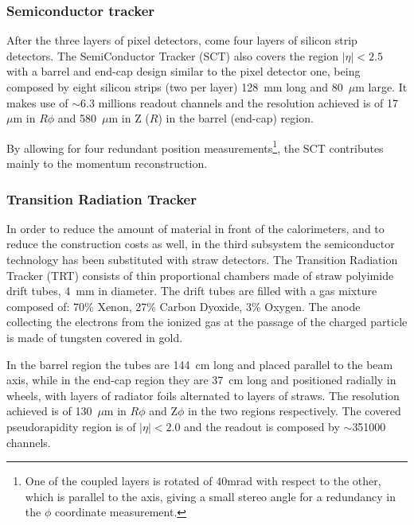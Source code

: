\subsubsection{Semiconductor tracker}

After the three layers of pixel detectors, come four layers of  silicon strip detectors. The SemiConductor
Tracker (SCT) also covers the region $|\eta|<2.5$ with a barrel and end-cap design similar to the 
pixel detector one, being composed by eight silicon strips (two per layer) 128~mm long and 80~$\mu$m large.
It makes use of $\sim$6.3 millions readout channels and the resolution achieved is of 17~$\mu$m 
in $R\phi$  and 580~$\mu$m in Z ($R$) in the barrel (end-cap) region.

By allowing for four redundant position measurements\footnote{One of the coupled layers is rotated of $40$mrad with respect
to the other, which is parallel to the axis, giving a small stereo angle for a redundancy in the $\phi$ coordinate measurement.}, 
the SCT contributes mainly to the momentum reconstruction.


\subsubsection{Transition Radiation Tracker}

In order to reduce the amount of material in front of the calorimeters, and to reduce the construction costs as well,
in the third subsystem the semiconductor technology has been substituted with straw detectors.
The Transition Radiation Tracker (TRT) consists of thin proportional chambers made of straw polyimide drift tubes, 4~mm in diameter.
The drift tubes are filled with a gas mixture composed of: 70\% Xenon, 27\% Carbon Dyoxide, 3\% Oxygen. The anode 
collecting the electrons from the ionized gas at the passage of the charged particle is made of
tungsten covered in gold.

In the barrel region the tubes are 144~cm long and placed parallel to the beam axis, while in the 
end-cap region they are 37~cm long and positioned radially in wheels, with layers of radiator foils alternated 
to layers of straws. The resolution achieved is of 130~$\mu$m in $R\phi$ and Z$\phi$  in the two regions respectively.
The covered pseudorapidity region is of $|\eta|<2.0$ and the readout is composed by $\sim$351000 channels.


